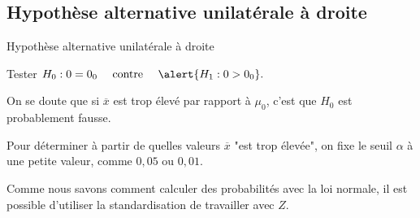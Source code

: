 \documentclass{BeamerTemplate}
\begin{document}
\subsection{Hypothèse alternative unilatérale à droite}

\begin{frame}[t]{Hypothèse alternative unilatérale à droite}

\small
Tester $H_0 : \mu = \mu_0 \quad\mbox{ contre }\quad \alert{H_1 : \mu > \mu_0}.$

\bigskip

On se doute que \alert{si $\overline{x}$ est trop élevé par rapport à $\mu_0$}, c'est que $H_0$  est probablement fausse.

\bigskip

Pour déterminer à partir de quelles valeurs $\overline x$ "est trop élevée", on
fixe le seuil $\alpha$ à une petite valeur, comme $0,05$ ou $0,01$.
\medskip

Comme nous savons comment calculer des probabilités avec la loi normale, il est possible d'utiliser la standardisation de travailler avec $Z$.

\medskip



\end{frame}
\end{document}
